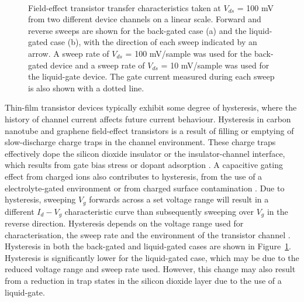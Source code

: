 \documentclass[
  a4paper,
]{scrbook}
\begin{document}
\begin{figure}
\begin{minipage}[t]{0.45\linewidth}
\end{minipage}%
%
\begin{minipage}[t]{0.01\linewidth}

{\centering 

~

}

\end{minipage}%

\caption{\label{fig-gating-hysteresis}Field-effect transistor transfer
characteristics taken at \(V_{ds}\) = 100 mV from two different device
channels on a linear scale. Forward and reverse sweeps are shown for the
back-gated case (a) and the liquid-gated case (b), with the direction of
each sweep indicated by an arrow. A sweep rate of \(V_{ds}\) = 100
mV/sample was used for the back-gated device and a sweep rate of
\(V_{ds}\) = 10 mV/sample was used for the liquid-gate device. The gate
current measured during each sweep is also shown with a dotted line.}

\end{figure}

Thin-film transistor devices typically exhibit some degree of
hysteresis, where the history of channel current affects future current
behaviour. Hysteresis in carbon nanotube and graphene field-effect
transistors is a result of filling or emptying of slow-discharge charge
traps in the channel environment. These charge traps effectively dope
the silicon dioxide insulator or the insulator-channel interface, which
results from gate bias stress or dopant adsorption
\autocite{McEuen2002,Kim2003,Wang2010,Bartolomeo2011,Bargaoui2018,Peng2018}.
A capacitive gating effect from charged ions also contributes to
hysteresis, from the use of a electrolyte-gated environment or from
charged surface contamination \autocite{Wang2010,Yao2021}. Due to
hysteresis, sweeping \(V_g\) forwards across a set voltage range will
result in a different \(I_d - V_g\) characteristic curve than
subsequently sweeping over \(V_g\) in the reverse direction. Hysteresis
depends on the voltage range used for characterisation, the sweep rate
and the environment of the transistor channel
\autocite{Kim2003,Wang2010}. Hysteresis in both the back-gated and
liquid-gated cases are shown in Figure~\ref{fig-gating-hysteresis}.
Hysteresis is significantly lower for the liquid-gated case, which may
be due to the reduced voltage range and sweep rate used. However, this
change may also result from a reduction in trap states in the silicon
dioxide layer due to the use of a liquid-gate.
\end{document}
